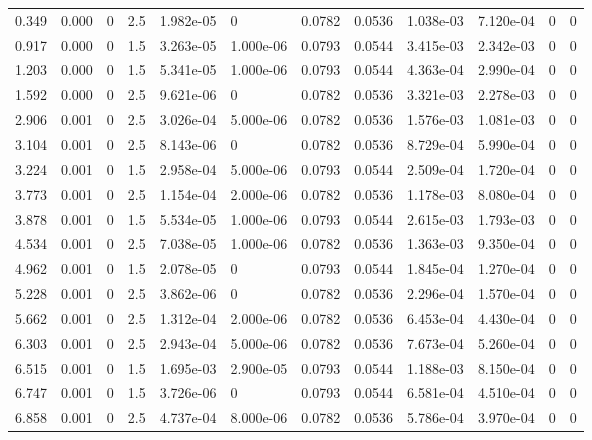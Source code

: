 \documentclass[preview]{standalone}
\begin{document}
{{\begin{tabular}{L{1.2cm}C{1.2cm} C{0.3cm}C{0.5cm} C{1.4cm}C{1.4cm} C{1.4cm}C{1.4cm} C{1.6cm}C{1.6cm} C{1.6cm}C{1.6cm}}
  0.349  &  0.000  & 0     & 2.5 &  1.982e-05  & 0  &  0.0782&   0.0536& 1.038e-03 & 7.120e-04   &  0 & 0  \\ 
  0.917  &  0.000  & 0     & 1.5 &  3.263e-05  & 1.000e-06  &  0.0793&   0.0544& 3.415e-03 & 2.342e-03   &  0 & 0  \\ 
  1.203  &  0.000  & 0     & 1.5 &  5.341e-05  & 1.000e-06  &  0.0793&   0.0544& 4.363e-04 & 2.990e-04   &  0 & 0  \\ 
  1.592  &  0.000  & 0     & 2.5 &  9.621e-06  & 0  &  0.0782&   0.0536& 3.321e-03 & 2.278e-03   &  0 & 0  \\ 
  2.906  &  0.001  & 0     & 2.5 &  3.026e-04  & 5.000e-06  &  0.0782&   0.0536& 1.576e-03 & 1.081e-03   &  0 & 0  \\ 
  3.104  &  0.001  & 0     & 2.5 &  8.143e-06  & 0  &  0.0782&   0.0536& 8.729e-04 & 5.990e-04   &  0 & 0  \\ 
  3.224  &  0.001  & 0     & 1.5 &  2.958e-04  & 5.000e-06  &  0.0793&   0.0544& 2.509e-04 & 1.720e-04   &  0 & 0  \\ 
  3.773  &  0.001  & 0     & 2.5 &  1.154e-04  & 2.000e-06  &  0.0782&   0.0536& 1.178e-03 & 8.080e-04   &  0 & 0  \\ 
  3.878  &  0.001  & 0     & 1.5 &  5.534e-05  & 1.000e-06  &  0.0793&   0.0544& 2.615e-03 & 1.793e-03   &  0 & 0  \\ 
  4.534  &  0.001  & 0     & 2.5 &  7.038e-05  & 1.000e-06  &  0.0782&   0.0536& 1.363e-03 & 9.350e-04   &  0 & 0  \\ 
  4.962  &  0.001  & 0     & 1.5 &  2.078e-05  & 0  &  0.0793&   0.0544& 1.845e-04 & 1.270e-04   &  0 & 0  \\ 
  5.228  &  0.001  & 0     & 2.5 &  3.862e-06  & 0  &  0.0782&   0.0536& 2.296e-04 & 1.570e-04   &  0 & 0  \\ 
  5.662  &  0.001  & 0     & 2.5 &  1.312e-04  & 2.000e-06  &  0.0782&   0.0536& 6.453e-04 & 4.430e-04   &  0 & 0  \\ 
  6.303  &  0.001  & 0     & 2.5 &  2.943e-04  & 5.000e-06  &  0.0782&   0.0536& 7.673e-04 & 5.260e-04   &  0 & 0  \\ 
  6.515  &  0.001  & 0     & 1.5 &  1.695e-03  & 2.900e-05  &  0.0793&   0.0544& 1.188e-03 & 8.150e-04   &  0 & 0  \\ 
  6.747  &  0.001  & 0     & 1.5 &  3.726e-06  & 0  &  0.0793&   0.0544& 6.581e-04 & 4.510e-04   &  0 & 0  \\ 
  6.858  &  0.001  & 0     & 2.5 &  4.737e-04  & 8.000e-06  &  0.0782&   0.0536& 5.786e-04 & 3.970e-04   &  0 & 0  \\ 

\end{tabular}}}
\end{document}
